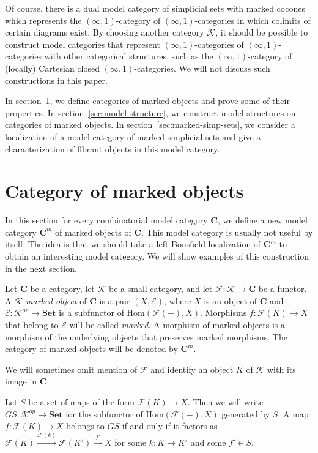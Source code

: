 \documentclass[reqno]{amsart}
\theoremstyle{definition}
\theoremstyle{remark}
\newcommand{\cat}[1]{\mathbf{#1}}
\newcommand{\C}{\cat{C}}
\newcommand{\Set}{\cat{Set}}
\newcommand{\K}{$\mathcal{K}$}
\newcommand{\Hom}{\mathrm{Hom}}
\numberwithin{figure}{section}
\begin{document}
Of course, there is a dual model category of simplicial sets with marked cocones which represents the $(\infty,1)$-category of $(\infty,1)$-categories in which colimits of certain diagrams exist.
By choosing another category $\mathcal{K}$, it should be possible to construct model categories that represent $(\infty,1)$-categories of $(\infty,1)$-categories with other categorical structures,
such as the $(\infty,1)$-category of (locally) Cartesian closed $(\infty,1)$-categories.
We will not discuss such constructions in this paper.

In section~\ref{sec:marked}, we define categories of marked objects and prove some of their properties.
In section~\ref{sec:model-structure}, we construct model structures on categories of marked objects.
In section~\ref{sec:marked-simp-sets}, we consider a localization of a model category of marked simplicial sets and give a characterization of fibrant objects in this model category.

\section{Category of marked objects}
\label{sec:marked}

In this section for every combinatorial model category $\C$, we define a new model category $\C^m$ of marked objects of $\C$.
This model category is usually not useful by itself.
The idea is that we should take a left Bousfield localization of $\C^m$ to obtain an interesting model category.
We will show examples of this construction in the next section.

\begin{defn}
Let $\C$ be a category, let $\mathcal{K}$ be a small category, and let $\mathcal{F} : \mathcal{K} \to \C$ be a functor.
A \emph{\K-marked object} of $\C$ is a pair $(X,\mathcal{E})$, where $X$ is an object of $\C$ and $\mathcal{E} : \mathcal{K}^{op} \to \Set$ is a subfunctor of $\Hom(\mathcal{F}(-),X)$.
Morphisms $f : \mathcal{F}(K) \to X$ that belong to $\mathcal{E}$ will be called \emph{marked}.
A morphism of marked objects is a morphism of the underlying objects that preserves marked morphisms.
The category of marked objects will be denoted by $\C^m$.
\end{defn}

We will sometimes omit mention of $\mathcal{F}$ and identify an object $K$ of $\mathcal{K}$ with its image in $\C$.

Let $S$ be a set of maps of the form $\mathcal{F}(K) \to X$.
Then we will write $GS : \mathcal{K}^{op} \to \Set$ for the subfunctor of $\Hom(\mathcal{F}(-),X)$ generated by $S$.
A map $f : \mathcal{F}(K) \to X$ belongs to $GS$ if and only if it factors as $\mathcal{F}(K) \xrightarrow{\mathcal{F}(k)} \mathcal{F}(K') \xrightarrow{f'} X$
for some $k : K \to K'$ and some $f' \in S$.
\end{document}
